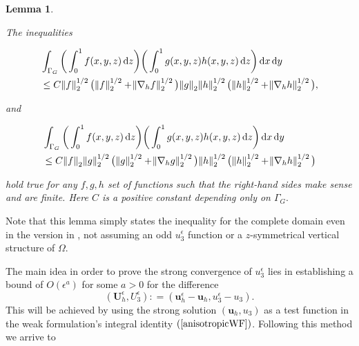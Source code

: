 \documentclass[11pt]{article}
\newtheorem{lemma}{Lemma}
\newcommand*\diff{\mathop{}\!\mathrm{d}}
\begin{document}
\begin{lemma}\label{LadyzhenskayatypeIEQ}

  The inequalities
  
  \begin{equation}\nonumber
    \begin{split}
      & \int_{\Gamma_G} \bigg ( \int_0^1 f(x,y,z) \diff z \bigg) \bigg ( \int_0^1 g(x,y,z) h(x,y,z) \diff z \bigg ) \diff x \diff y \\
      & \leq C \norm{f}_2^{1/2} \big ( \norm{f}_2^{1/2} + \norm{\nabla_h f}_2^{1/2} \big ) \norm{g}_2 \norm{h}_2^{1/2} \big (\norm{h}_2^{1/2} + \norm{\nabla_h h}_2^{1/2} \big ),
    \end{split}
  \end{equation}
  
  and
  
  \begin{equation}\nonumber
    \begin{split}
      & \int_{\Gamma_G} \bigg ( \int_0^1 f(x,y,z) \diff z \bigg) \bigg ( \int_0^1 g(x,y,z) h(x,y,z) \diff z \bigg ) \diff x \diff y \\
      & \leq C \norm{f}_2 \norm{g}_2^{1/2} \big ( \norm{g}_2^{1/2} + \norm{\nabla_h g}_2^{1/2} \big ) \norm{h}_2^{1/2} \big (\norm{h}_2^{1/2} + \norm{\nabla_h h}_2^{1/2} \big )
    \end{split}
  \end{equation}
  
  hold true for any $f,g,h$ set of functions such that the right-hand sides make sense and are finite. Here $C$ is a positive constant depending only on $\Gamma_G.$

\end{lemma}

Note that this lemma simply states the inequality for the complete domain even in the version in \cite{li2019primitive}, not assuming an odd $u_3^\epsilon$ function or a $z$-symmetrical vertical structure of $\Omega$.
  
The main idea in order to prove the strong convergence of $u^\epsilon_3$ lies in establishing a bound of $O(\epsilon^a)$ for some $a>0$ for the difference $$(\mathbf{U}_h^\epsilon, U_3^\epsilon): = (\mathbf{u}_h^\epsilon - \mathbf{u}_h, u_3^\epsilon - u_3).$$ This will be achieved by using the strong solution $(\mathbf{u}_h,u_3)$ as a test function in the weak formulation's integral identity $(\ref{anisotropicWF})$. Following this method we arrive to
\end{document}
